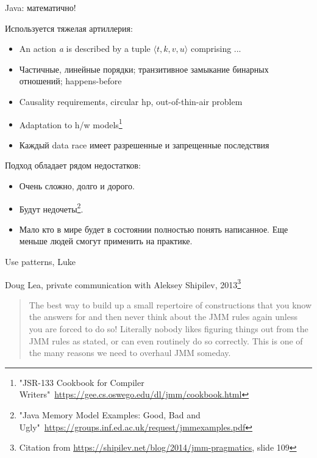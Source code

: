 \begin{frame}{Java: математично!}

\pause
Используется тяжелая артиллерия: 
\begin{itemize}
	\pause
	\item An action \textit{a} is described by a tuple $\langle t, k, v, u\rangle$ comprising ...\
	\pause
	\item Частичные, линейные порядки; транзитивное замыкание бинарных отношений; happens-before
	\pause
	\item Causality requirements, circular hp, out-of-thin-air problem
	\pause
	\item Adaptation to h/w models\footnote<6->{\tiny"JSR-133 Cookbook for Compiler Writers"\ \url{https://gee.cs.oswego.edu/dl/jmm/cookbook.html}}
	\pause
	\item Каждый data race имеет разрешенные и запрещенные последствия
\end{itemize}

\pause
Подход обладает рядом недостатков:
\begin{itemize}
	\item Очень сложно, долго и дорого.
	\item Будут недочеты\footnote<8->{\tiny"Java Memory Model Examples: Good, Bad and Ugly"\ \url{https://groups.inf.ed.ac.uk/request/jmmexamples.pdf}}.
	\item Мало кто в мире будет в состоянии полностью понять написанное. Еще меньше людей смогут применить на практике.
\end{itemize}
\end{frame}

\begin{frame}{Use patterns, Luke}

Doug Lea, private communication with Aleksey Shipilev, 2013\footnote{\tiny Citation from \url{https://shipilev.net/blog/2014/jmm-pragmatics}, slide 109}

\begin{quote}
The best way to build up a small repertoire of constructions that you know the answers for and then never think about the JMM rules again unless you are forced to do so! Literally nobody likes figuring things out from the JMM rules as stated, or can even routinely do so correctly.
This is one of the many reasons we need to overhaul JMM someday.
\end{quote}
\end{frame}


